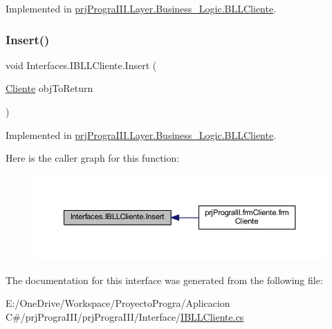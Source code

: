 Implemented in \hyperlink{classprj_progra_i_i_i_1_1_layer_1_1_business___logic_1_1_b_l_l_cliente_a9963b076dc230773e81b866992a13a14}{prj\+Progra\+I\+I\+I.\+Layer.\+Business\+\_\+\+Logic.\+B\+L\+L\+Cliente}.

\hypertarget{interface_interfaces_1_1_i_b_l_l_cliente_aaf2e62f3c57006ecf12ba4559a70448d}{}\label{interface_interfaces_1_1_i_b_l_l_cliente_aaf2e62f3c57006ecf12ba4559a70448d} 
\subsubsection{\texorpdfstring{Insert()}{Insert()}}
{\footnotesize\ttfamily void Interfaces.\+I\+B\+L\+L\+Cliente.\+Insert (\begin{DoxyParamCaption}\item[{\hyperlink{classprj_progra_i_i_i_1_1_layer_1_1_entities_1_1_cliente}{Cliente}}]{obj\+To\+Return }\end{DoxyParamCaption})}



Implemented in \hyperlink{classprj_progra_i_i_i_1_1_layer_1_1_business___logic_1_1_b_l_l_cliente_a4412306e108649758d603cb510af7704}{prj\+Progra\+I\+I\+I.\+Layer.\+Business\+\_\+\+Logic.\+B\+L\+L\+Cliente}.

Here is the caller graph for this function\+:
\nopagebreak
\begin{figure}[H]
\begin{center}
\leavevmode
\includegraphics[width=350pt]{interface_interfaces_1_1_i_b_l_l_cliente_aaf2e62f3c57006ecf12ba4559a70448d_icgraph}
\end{center}
\end{figure}


The documentation for this interface was generated from the following file\+:\begin{DoxyCompactItemize}
\item 
E\+:/\+One\+Drive/\+Workspace/\+Proyecto\+Progra/\+Aplicacion C\#/prj\+Progra\+I\+I\+I/prj\+Progra\+I\+I\+I/\+Interface/\hyperlink{_i_b_l_l_cliente_8cs}{I\+B\+L\+L\+Cliente.\+cs}\end{DoxyCompactItemize}
